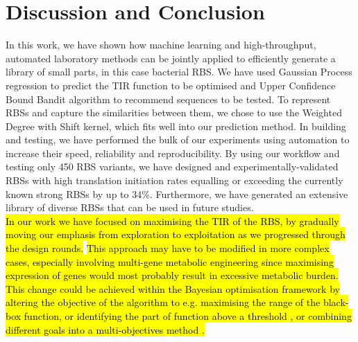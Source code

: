 \documentclass{article}
\begin{document}
\section{Discussion and Conclusion}

In this work, we have shown how machine learning and high-throughput, automated laboratory methods can be jointly applied to efficiently generate a library of small parts, in this case bacterial RBS.
We have used Gaussian Process regression to predict the TIR function to be optimised and Upper Confidence Bound Bandit algorithm to recommend sequences to be tested.
To represent RBSs and capture the similarities between them, we chose to use the
Weighted Degree with Shift kernel, which fits well into our prediction method.
In building and testing, we have performed the bulk of our experiments using automation to increase their speed, reliability and reproducibility.
By using our workflow and testing only 450 RBS variants, we have designed and experimentally-validated RBSs with high translation initiation rates equalling or exceeding the currently known strong RBSs by up to 34\%.
Furthermore, we have generated an extensive library of diverse RBSs that can be used in future studies.\\

\hl{In our work we have focused on maximising the TIR of the RBS, by gradually moving our emphasis from exploration to exploitation as we progressed through the design rounds.}
\hl{This approach may have to be modified in more complex cases, especially involving multi-gene metabolic engineering since maximising expression of genes would most probably result in excessive metabolic burden.}
\hl{This change could be achieved within the Bayesian optimisation framework by altering the objective of the algorithm to e.g. maximising the range of the black-box function, or identifying the part of function above a threshold \mbox{\cite{gotovos2013active}}, or combining different goals into a multi-objectives method \mbox{\cite{shu2020new}}.}
\\
\end{document}
